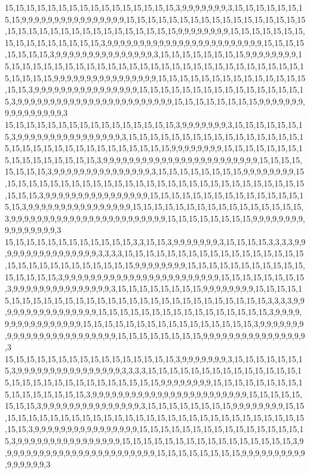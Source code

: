 15,15,15,15,15,15,15,15,15,15,15,15,15,15,15,15,3,9,9,9,9,9,9,9,3,15,15,15,15,15,15,15,15,9,9,9,9,9,9,9,9,9,9,9,9,9,9,9,9,15,15,15,15,15,15,15,15,15,15,15,15,15,15,15,15,15,15,15,15,15,15,15,15,15,15,15,15,15,15,15,15,15,9,9,9,9,9,9,9,9,15,15,15,15,15,15,15,15,15,15,15,15,15,15,15,15,3,9,9,9,9,9,9,9,9,9,9,9,9,9,9,9,9,9,9,9,9,9,9,9,9,15,15,15,15,15,15,15,15,3,9,9,9,9,9,9,9,9,9,9,9,9,9,9,9,3,15,15,15,15,15,15,15,15,9,9,9,9,9,9,9,9,15,15,15,15,15,15,15,15,15,15,15,15,15,15,15,15,15,15,15,15,15,15,15,15,15,15,15,15,15,15,15,15,15,9,9,9,9,9,9,9,9,9,9,9,9,9,9,9,9,15,15,15,15,15,15,15,15,15,15,15,15,15,15,15,15,3,9,9,9,9,9,9,9,9,9,9,9,9,9,9,9,9,15,15,15,15,15,15,15,15,15,15,15,15,15,15,15,15,3,9,9,9,9,9,9,9,9,9,9,9,9,9,9,9,9,9,9,9,9,9,9,9,9,15,15,15,15,15,15,15,15,9,9,9,9,9,9,9,9,9,9,9,9,9,9,9,9,3
15,15,15,15,15,15,15,15,15,15,15,15,15,15,15,15,3,9,9,9,9,9,9,9,3,15,15,15,15,15,15,15,3,9,9,9,9,9,9,9,9,9,9,9,9,9,9,9,9,3,15,15,15,15,15,15,15,15,15,15,15,15,15,15,15,15,15,15,15,15,15,15,15,15,15,15,15,15,15,15,15,15,9,9,9,9,9,9,9,9,15,15,15,15,15,15,15,15,15,15,15,15,15,15,15,15,3,9,9,9,9,9,9,9,9,9,9,9,9,9,9,9,9,9,9,9,9,9,9,9,9,15,15,15,15,15,15,15,15,3,9,9,9,9,9,9,9,9,9,9,9,9,9,9,9,3,15,15,15,15,15,15,15,15,9,9,9,9,9,9,9,9,15,15,15,15,15,15,15,15,15,15,15,15,15,15,15,15,15,15,15,15,15,15,15,15,15,15,15,15,15,15,15,15,3,9,9,9,9,9,9,9,9,9,9,9,9,9,9,9,9,15,15,15,15,15,15,15,15,15,15,15,15,15,15,15,15,3,9,9,9,9,9,9,9,9,9,9,9,9,9,9,9,9,15,15,15,15,15,15,15,15,15,15,15,15,15,15,15,15,3,9,9,9,9,9,9,9,9,9,9,9,9,9,9,9,9,9,9,9,9,9,9,9,9,15,15,15,15,15,15,15,15,9,9,9,9,9,9,9,9,9,9,9,9,9,9,9,9,3
15,15,15,15,15,15,15,15,15,15,15,15,3,3,15,15,3,9,9,9,9,9,9,9,3,15,15,15,15,3,3,3,3,9,9,9,9,9,9,9,9,9,9,9,9,9,9,9,9,3,3,3,3,15,15,15,15,15,15,15,15,15,15,15,15,15,15,15,15,15,15,15,15,15,15,15,15,15,15,15,15,15,9,9,9,9,9,9,9,9,15,15,15,15,15,15,15,15,15,15,15,15,15,15,15,15,3,9,9,9,9,9,9,9,9,9,9,9,9,9,9,9,9,9,9,9,9,9,9,9,9,15,15,15,15,15,15,15,15,3,9,9,9,9,9,9,9,9,9,9,9,9,9,9,9,3,15,15,15,15,15,15,15,15,9,9,9,9,9,9,9,9,15,15,15,15,15,15,15,15,15,15,15,15,15,15,15,15,15,15,15,15,15,15,15,15,15,15,15,15,15,3,3,3,3,9,9,9,9,9,9,9,9,9,9,9,9,9,9,9,9,15,15,15,15,15,15,15,15,15,15,15,15,15,15,15,15,3,9,9,9,9,9,9,9,9,9,9,9,9,9,9,9,9,15,15,15,15,15,15,15,15,15,15,15,15,15,15,15,15,3,9,9,9,9,9,9,9,9,9,9,9,9,9,9,9,9,9,9,9,9,9,9,9,9,15,15,15,15,15,15,15,15,9,9,9,9,9,9,9,9,9,9,9,9,9,9,9,9,3
15,15,15,15,15,15,15,15,15,15,15,15,15,15,15,15,3,9,9,9,9,9,9,9,3,15,15,15,15,15,15,15,3,9,9,9,9,9,9,9,9,9,9,9,9,9,9,9,9,3,3,3,3,15,15,15,15,15,15,15,15,15,15,15,15,15,15,15,15,15,15,15,15,15,15,15,15,15,15,15,15,15,9,9,9,9,9,9,9,9,15,15,15,15,15,15,15,15,15,15,15,15,15,15,15,15,3,9,9,9,9,9,9,9,9,9,9,9,9,9,9,9,9,9,9,9,9,9,9,9,9,15,15,15,15,15,15,15,15,3,9,9,9,9,9,9,9,9,9,9,9,9,9,9,9,3,15,15,15,15,15,15,15,15,9,9,9,9,9,9,9,9,15,15,15,15,15,15,15,15,15,15,15,15,15,15,15,15,15,15,15,15,15,15,15,15,15,15,15,15,15,15,15,15,3,9,9,9,9,9,9,9,9,9,9,9,9,9,9,9,9,15,15,15,15,15,15,15,15,15,15,15,15,15,15,15,15,3,9,9,9,9,9,9,9,9,9,9,9,9,9,9,9,9,15,15,15,15,15,15,15,15,15,15,15,15,15,15,15,15,3,9,9,9,9,9,9,9,9,9,9,9,9,9,9,9,9,9,9,9,9,9,9,9,9,15,15,15,15,15,15,15,15,9,9,9,9,9,9,9,9,9,9,9,9,9,9,9,9,3
